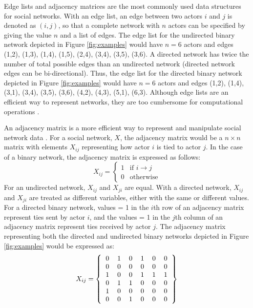 Edge lists and adjacency matrices are the most commonly used data structures for social networks. With an edge list, an edge between two actors $i$ and $j$ is denoted as $(i,j)$, so that a complete network with $n$ actors can be specified by giving the value $n$ and a list of edges. The edge list for the undirected binary network depicted in Figure \ref{fig:examples} would have $n = 6$ actors and edges (1,2), (1,3), (1,4), (1,5), (2,4), (3,4), (3,5), (3,6). A directed network has twice the number of total possible edges than an undirected network (directed network edges can be bi-directional). Thus, the edge list for the directed binary network depicted in Figure \ref{fig:examples} would have $n = 6$ actors and edges (1,2), (1,4), (3,1), (3,4), (3,5), (3,6), (4,2), (4,3), (5,1), (6,3). Although edge lists are an efficient way to represent networks, they are too cumbersome for computational operations \citep{newman2010networks}. \medskip

An adjacency matrix is a more efficient way to represent and manipulate social network data \citep{hummon1990computational}. For a social network, $X$, the adjacency matrix would be a $n \times n$ matrix with elements $X_{ij}$ representing how actor $i$ is tied to actor $j$. In the case of a binary network, the adjacency matrix is expressed as follows: 
\[
X_{ij} =
\begin{cases}
    1 & \text{if  } i \rightarrow j \\
    0 & \text{otherwise}
\end{cases}
\]
For an undirected network, $X_{ij}$ and $X_{ji}$ are equal. With a directed network, $X_{ij}$ and $X_{ji}$ are treated as different variables, either with the same or different values. For a directed binary network, values = 1 in the $i$th row of an adjacency matrix represent ties sent by actor $i$, and the values = 1 in the $j$th column of an adjacency matrix represent ties received by actor $j$. The adjacency matrix representing both the directed and undirected binary networks depicted in Figure \ref{fig:examples} would be expressed as: \bigskip
$$
X_{ij} =
\left \{
  \begin{tabular}{cccccc}
    0 & 1 & 0 & 1 & 0 & 0 \\
    0 & 0 & 0 & 0 & 0 & 0 \\
    1 & 0 & 0 & 1 & 1 & 1 \\
    0 & 1 & 1 & 0 & 0 & 0 \\
    1 & 0 & 0 & 0 & 0 & 0 \\
    0 & 0 & 1 & 0 & 0 & 0
  \end{tabular}
\right \}
$$ \medskip


